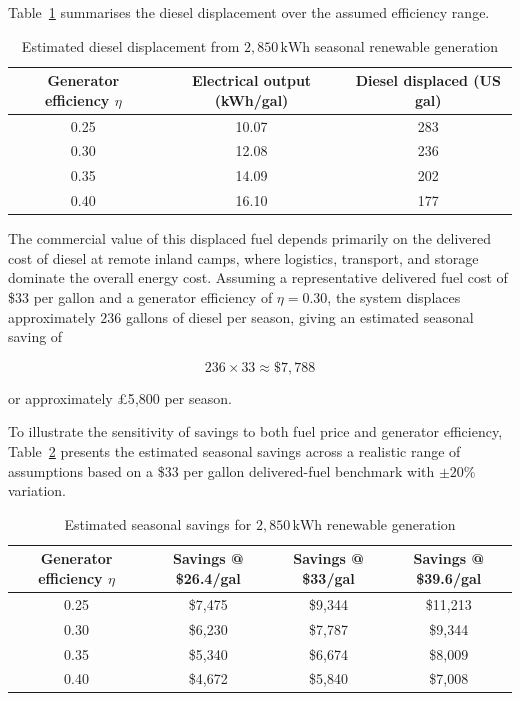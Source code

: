 \documentclass[11pt,a4paper]{article}
\begin{document}
Table~\ref{tab:diesel_displacement_updated} summarises the diesel
displacement over the assumed efficiency range.

\begin{table}[h]
\centering
\caption{Estimated diesel displacement from $2{,}850\,\text{kWh}$ seasonal renewable generation}
\label{tab:diesel_displacement_updated}
\begin{tabular}{ccc}
\toprule
Generator efficiency $\eta$ & Electrical output (kWh/gal) & Diesel displaced (US gal) \\
\midrule
0.25 & 10.07 & 283 \\
0.30 & 12.08 & 236 \\
0.35 & 14.09 & 202 \\
0.40 & 16.10 & 177 \\
\bottomrule
\end{tabular}
\end{table}

The commercial value of this displaced fuel depends primarily on the
delivered cost of diesel at remote inland camps, where logistics,
transport, and storage dominate the overall energy cost. Assuming a
representative delivered fuel cost of \$33 per gallon and a generator
efficiency of $\eta = 0.30$, the system displaces approximately
$236$ gallons of diesel per season, giving an estimated seasonal saving of

\begin{equation}
236 \times 33 \approx \$7{,}788
\end{equation}

or approximately £5{,}800 per season.

To illustrate the sensitivity of savings to both fuel price and generator
efficiency, Table~\ref{tab:savings_sensitivity_updated} presents the
estimated seasonal savings across a realistic range of assumptions based on a
\$33 per gallon delivered-fuel benchmark with $\pm 20\%$ variation.

\begin{table}[h]
\centering
\caption{Estimated seasonal savings for $2{,}850\,\text{kWh}$ renewable generation}
\label{tab:savings_sensitivity_updated}
\begin{tabular}{cccc}
\toprule
Generator efficiency $\eta$ & Savings @ \$26.4/gal & Savings @ \$33/gal & Savings @ \$39.6/gal \\
\midrule
0.25 & \$7{,}475 & \$9{,}344 & \$11{,}213 \\
0.30 & \$6{,}230 & \$7{,}787 & \$9{,}344 \\
0.35 & \$5{,}340 & \$6{,}674 & \$8{,}009 \\
0.40 & \$4{,}672 & \$5{,}840 & \$7{,}008 \\
\bottomrule
\end{tabular}
\end{table}
\end{document}
